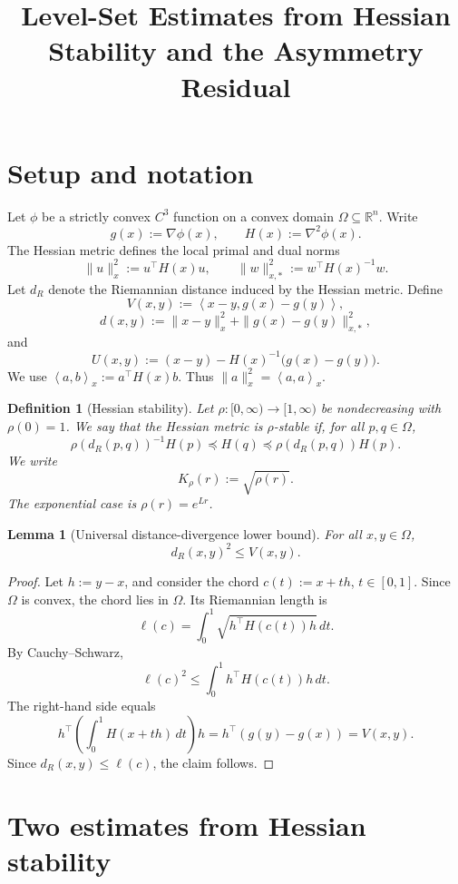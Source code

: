 \documentclass[11pt]{article}
\title{Level-Set Estimates from Hessian Stability and the Asymmetry Residual}
\author{}
\date{}
\newtheorem{definition}{Definition}
\newtheorem{lemma}{Lemma}
\newcommand{\R}{\mathbb{R}}
\newcommand{\ip}[2]{\left\langle #1,#2\right\rangle}
\newcommand{\ipx}[2]{\left\langle #1,#2\right\rangle_x}
\begin{document}
\maketitle

\section{Setup and notation}

Let \(\phi\) be a strictly convex \(C^3\) function on a convex domain
\(\Omega\subseteq\R^n\). Write
\[
    g(x):=\nabla \phi(x),
    \qquad
    H(x):=\nabla^2\phi(x).
\]
The Hessian metric defines the local primal and dual norms
\[
    \|u\|_x^2:=u^\top H(x)u,
    \qquad
    \|w\|_{x,*}^2:=w^\top H(x)^{-1}w.
\]
Let \(d_R\) denote the Riemannian distance induced by the Hessian metric. Define
\[
    V(x,y):=\ip{x-y}{g(x)-g(y)},
\]
\[
    d(x,y):=
    \|x-y\|_x^2+
    \|g(x)-g(y)\|_{x,*}^2,
\]
and
\[
    U(x,y):=(x-y)-H(x)^{-1}\bigl(g(x)-g(y)\bigr).
\]
We use \(\ipx{a}{b}:=a^\top H(x)b\). Thus \(\|a\|_x^2=\ipx{a}{a}\).

\begin{definition}[Hessian stability]
Let \(\rho:[0,\infty)\to[1,\infty)\) be nondecreasing with \(\rho(0)=1\). We say that the Hessian metric is \(\rho\)-stable if, for all \(p,q\in\Omega\),
\[
    \rho(d_R(p,q))^{-1}H(p)
    \preceq
    H(q)
    \preceq
    \rho(d_R(p,q))H(p).
\]
We write
\[
    K_\rho(r):=\sqrt{\rho(r)}.
\]
The exponential case is \(\rho(r)=e^{Lr}\).
\end{definition}

\begin{lemma}[Universal distance-divergence lower bound]\label{lem:distance-V}
For all \(x,y\in\Omega\),
\[
    d_R(x,y)^2\le V(x,y).
\]
\end{lemma}

\begin{proof}
Let \(h:=y-x\), and consider the chord \(c(t):=x+th\), \(t\in[0,1]\). Since \(\Omega\) is convex, the chord lies in \(\Omega\). Its Riemannian length is
\[
    \ell(c)=\int_0^1 \sqrt{h^\top H(c(t))h}\,dt.
\]
By Cauchy--Schwarz,
\[
    \ell(c)^2
    \le
    \int_0^1 h^\top H(c(t))h\,dt.
\]
The right-hand side equals
\[
    h^\top\left(\int_0^1 H(x+th)\,dt\right)h
    =
    h^\top(g(y)-g(x))
    =
    V(x,y).
\]
Since \(d_R(x,y)\le \ell(c)\), the claim follows.
\end{proof}

\section{Two estimates from Hessian stability}
\end{document}
